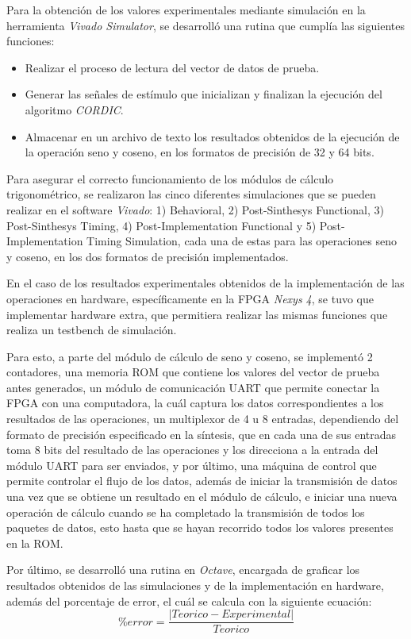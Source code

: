 Para la obtención de los valores experimentales mediante simulación en la herramienta \textit{Vivado Simulator}, se desarrolló una rutina que cumplía las siguientes funciones:
\begin{itemize}
	\item	Realizar el proceso de lectura del vector de datos de prueba.
	\item	Generar las señales de estímulo que inicializan y finalizan la ejecución del algoritmo \textit{CORDIC}.
	\item	Almacenar en un archivo de texto los resultados obtenidos de la ejecución de la operación seno y coseno, en los formatos de precisión de 32 y 64 bits.
\end{itemize}

Para asegurar el correcto funcionamiento de los módulos de cálculo trigonométrico, se realizaron las cinco diferentes simulaciones que se pueden realizar en el software \textit{Vivado}: 1) Behavioral, 2) Post-Sinthesys Functional, 3) Post-Sinthesys Timing, 4) Post-Implementation Functional y 5) Post-Implementation Timing Simulation, cada una de estas para las operaciones seno y coseno, en los dos formatos de precisión implementados.

En el caso de los resultados experimentales obtenidos de la implementación de las operaciones en hardware, específicamente en la FPGA \textit{Nexys 4}, se tuvo que implementar hardware extra, que permitiera realizar las mismas funciones que realiza un testbench de simulación.

Para esto, a parte del módulo de cálculo de seno y coseno, se implementó 2 contadores, una memoria ROM que contiene los valores del vector de prueba antes generados, un módulo de comunicación UART que permite conectar la FPGA con una computadora, la cuál captura los datos correspondientes a los resultados de las operaciones, un multiplexor de 4 u 8 entradas, dependiendo del formato de precisión especificado en la síntesis, que en cada una de sus entradas toma 8 bits del resultado de las operaciones y los direcciona a la entrada del módulo UART para ser enviados, y por último, una máquina de control que permite controlar el flujo de los datos, además de iniciar la transmisión de datos una vez que se obtiene un resultado en el módulo de cálculo, e iniciar una nueva operación de cálculo cuando se ha completado la transmisión de todos los paquetes de datos, esto hasta que se hayan recorrido todos los valores presentes en la ROM.

Por último, se desarrolló una rutina en \textit{Octave}, encargada de graficar los resultados obtenidos de las simulaciones y de la implementación en hardware, además del porcentaje de error, el cuál se calcula con la siguiente ecuación:
\begin{equation}\label{eq:error_porc}
\% error = \dfrac{\vert Teorico - Experimental \vert}{Teorico}
\end{equation}


